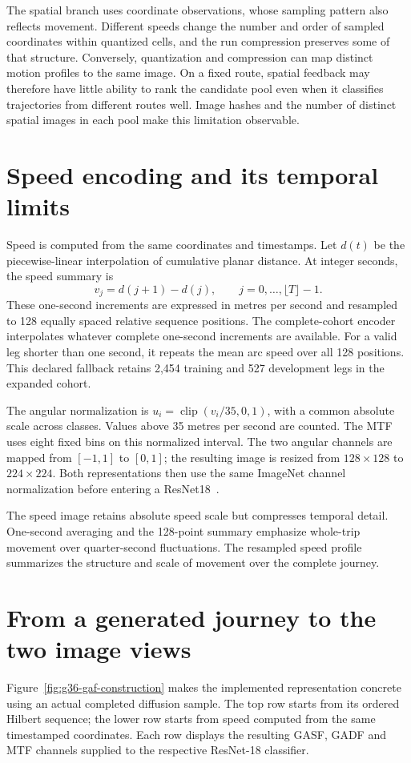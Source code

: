 The spatial branch uses coordinate observations, whose sampling pattern also reflects movement. Different speeds change the number and order of sampled coordinates within quantized cells, and the run compression preserves some of that structure. Conversely, quantization and compression can map distinct motion profiles to the same image. On a fixed route, spatial feedback may therefore have little ability to rank the candidate pool even when it classifies trajectories from different routes well. Image hashes and the number of distinct spatial images in each pool make this limitation observable.

\section{Speed encoding and its temporal limits}
Speed is computed from the same coordinates and timestamps. Let $d(t)$ be the piecewise-linear interpolation of cumulative planar distance. At integer seconds, the speed summary is
\begin{equation}
 v_j=d(j+1)-d(j),\qquad j=0,\ldots,\lfloor T\rfloor-1.
 \label{eq:native-speed-view}
\end{equation}
These one-second increments are expressed in metres per second and resampled to 128 equally spaced relative sequence positions. The complete-cohort encoder interpolates whatever complete one-second increments are available. For a valid leg shorter than one second, it repeats the mean arc speed over all 128 positions. This declared fallback retains 2,454 training and 527 development legs in the expanded cohort.

The angular normalization is $u_i=\operatorname{clip}(v_i/35,0,1)$, with a common absolute scale across classes. Values above 35 metres per second are counted. The MTF uses eight fixed bins on this normalized interval. The two angular channels are mapped from $[-1,1]$ to $[0,1]$; the resulting image is resized from $128\times128$ to $224\times224$. Both representations then use the same ImageNet channel normalization before entering a ResNet18~\cite{resnet}.

The speed image retains absolute speed scale but compresses temporal detail. One-second averaging and the 128-point summary emphasize whole-trip movement over quarter-second fluctuations. The resampled speed profile summarizes the structure and scale of movement over the complete journey.

\FloatBarrier
\section{From a generated journey to the two image views}
Figure~\ref{fig:g36-gaf-construction} makes the implemented representation concrete using an actual completed diffusion sample. The top row starts from its ordered Hilbert sequence; the lower row starts from speed computed from the same timestamped coordinates. Each row displays the resulting GASF, GADF and MTF channels supplied to the respective ResNet-18 classifier.


